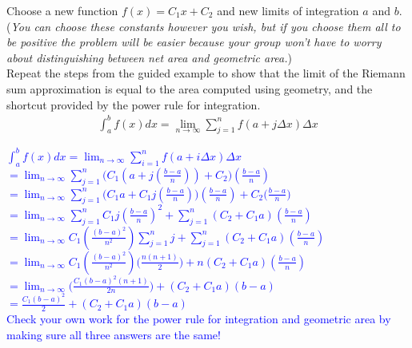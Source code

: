 \documentclass{ximera}
\begin{document}
\begin{exercise}    
    Choose a new function $f(x) = C_{1}x + C_{2}$ and new limits of integration $a$ and $b$. (\textit{You can choose these constants however you wish, but if you choose them all to be positive the problem will be easier because your group won't have to worry about distinguishing between net area and geometric area.})\\

    Repeat the steps from the guided example to show that the limit of the Riemann sum approximation is equal to the area computed using geometry, and the shortcut provided by the power rule for integration.\\

\begin{align}
	\int_{a}^b f(x) dx = \lim_{n\rightarrow \infty} \sum_{j=1}^n f(a + j\Delta x) \Delta x \nonumber
\end{align}

\textcolor{blue}{$\displaystyle\int_{a}^b f(x) dx = \lim_{n\rightarrow \infty} \sum_{i=1}^n f(a + i\Delta x) \Delta x$\\
$\displaystyle=\lim_{n\rightarrow \infty} \sum_{j=1}^n \big(C_1(a+j(\frac{b-a}{n}))+C_2\big)(\frac{b-a}{n})$\\
$\displaystyle =\lim_{n\rightarrow \infty} \sum_{j=1}^n \big(C_1a+C_1j(\frac{b-a}{n})\big)(\frac{b-a}{n})+C_2\big(\frac{b-a}{n})$\\
$\displaystyle=\lim_{n\rightarrow \infty} \sum_{j=1}^n C_1j(\frac{b-a}{n})^2+\sum_{j=1}^n(C_2+C_1a)(\frac{b-a}{n})$\\
$\displaystyle=\lim_{n\rightarrow \infty} C_1(\frac{(b-a)^2}{n^2})\sum_{j=1}^n j+\sum_{j=1}^n(C_2+C_1a)(\frac{b-a}{n})$\\
$\displaystyle=\lim_{n\rightarrow \infty} C_1(\frac{(b-a)^2}{n^2})\bigg(\frac{n(n+1)}{2}\bigg)+n(C_2+C_1a)(\frac{b-a}{n})$\\
$\displaystyle=\lim_{n\rightarrow \infty} \bigg(\frac{C_1(b-a)^2(n+1)}{2n}\bigg)+(C_2+C_1a)(b-a)$\\
$\displaystyle =\frac{C_1(b-a)^2}{2}+(C_2+C_1a)(b-a)$\\
Check your own work for the power rule for integration and geometric area by making sure all three answers are the same!}
\end{exercise}
\end{document}
